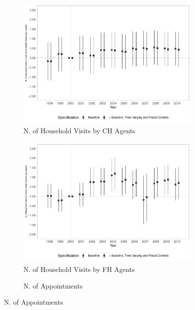 \begin{figure}[h!]
\begin{center}
\begin{subfigure}{0.32\textwidth}
        \centering
        \caption{\scriptsize N. of Household Visits by CH Agents}\label{fig:12e}
        \includegraphics[width=\textwidth]{plots/siab_visit_cha_pacs_pcapita_dist_ec29_baseline_dist_ec29_baseline_12.pdf}
    \end{subfigure}
    \begin{subfigure}{0.32\textwidth}
        \centering
        \caption{\scriptsize N. of Household Visits by FH Agents}\label{fig:12f}
        \includegraphics[width=\textwidth]{plots/siab_visit_cha_psf_pcapita_dist_ec29_baseline_dist_ec29_baseline_12.pdf}
    \end{subfigure}
        \begin{subfigure}{0.32\textwidth}
        \caption{\scriptsize N. of Appointments}\label{fig:12g}
        \centering

\end{subfigure}
\end{center}
\end{figure}
